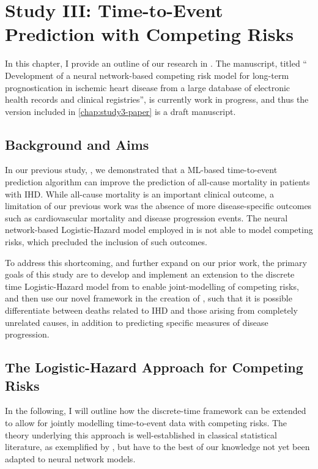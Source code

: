 \chapter{Study III: Time-to-Event Prediction with Competing Risks}
\label{chap:study3-outline}

In this chapter, I provide an outline of our research in \studyiii{}.
The manuscript, titled \enquote{%
    Development of a neural network-based competing risk model for long-term
    prognostication in ischemic heart disease from a large database of
    electronic health records and clinical registries},
is currently work in progress, 
and thus the version included in \cref{chap:study3-paper} is 
a draft manuscript.

\section{Background and Aims}

In our previous study, \studyii{}, we demonstrated that a \ac{ML}-based 
time-to-event prediction algorithm can improve the prediction of all-cause
mortality in patients with \ac{IHD}. 
While all-cause mortality is an important clinical outcome, 
a limitation of our previous work was the absence of more
disease-specific outcomes such as cardiovascular mortality
and disease progression events.
The neural network-based Logistic-Hazard model employed in 
is not able to model competing risks, which precluded the inclusion
of such outcomes.

To address this shortcoming, and further expand on our prior work,
the primary goals of this study are to develop and implement an extension 
to the discrete time Logistic-Hazard model from \textcite{gensheimerScalable2019} 
to enable joint-modelling of competing risks,
and then use our novel framework in the creation of , 
such that it is possible differentiate between deaths related to 
\ac{IHD} and those arising from completely unrelated causes,
in addition to predicting specific measures of disease progression.

\section{The Logistic-Hazard Approach for Competing Risks}

In the following, I will outline how the discrete-time framework can 
be extended to allow for jointly modelling time-to-event data with competing
risks. The theory underlying this approach is well-established in
classical statistical literature, as exemplified by \textcite{tutzModeling2016}, 
but have to the best of our knowledge not yet been adapted to 
neural network models. 

